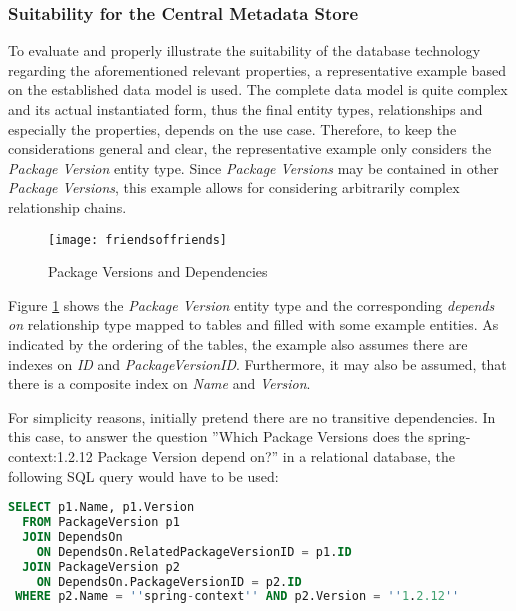 \subsubsection{Suitability for the Central Metadata Store}
To evaluate and properly illustrate the suitability of the database technology regarding the aforementioned relevant properties, a representative example based on the established data model is used. The complete data model is quite complex and its actual instantiated form, thus the final entity types, relationships and especially the properties, depends on the use case. Therefore, to keep the considerations general and clear, the representative example only considers the \emph{Package Version} entity type. Since \emph{Package Versions} may be contained in other \emph{Package Versions}, this example allows for considering arbitrarily complex relationship chains.\par

\begin{figure}[H]
	\centering
	\texttt{[image: friendsoffriends]}
	\caption[Package Versions and Dependencies as Table]{Package Versions and Dependencies }
	\label{fig:PackageVersionsAndDependencies}
\end{figure}

Figure \ref{fig:PackageVersionsAndDependencies} shows the \emph{Package Version} entity type and the corresponding \emph{depends on} relationship type mapped to tables and filled with some example entities.  As indicated by the ordering of the tables, the example also assumes there are indexes on \emph{ID} and \emph{PackageVersionID}. Furthermore, it may also be assumed, that there is a composite index on \emph{Name} and \emph{Version}.\par
For simplicity reasons, initially pretend there are no transitive dependencies. In this case, to answer the question ''Which Package Versions does the spring-context:1.2.12 Package Version depend on?'' in a relational database, the following SQL query would have to be used:

\begin{lstlisting}[language=SQL, caption=Package Version Dependencies, captionpos=b, label=lst:PackageVersionDependencies]
SELECT p1.Name, p1.Version
  FROM PackageVersion p1 
  JOIN DependsOn
    ON DependsOn.RelatedPackageVersionID = p1.ID
  JOIN PackageVersion p2
    ON DependsOn.PackageVersionID = p2.ID
 WHERE p2.Name = ''spring-context'' AND p2.Version = ''1.2.12''
\end{lstlisting}

